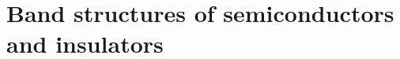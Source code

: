 \cleardoublepage
\chapter{Band structures of semiconductors and insulators\label{ch:band-structures}}

